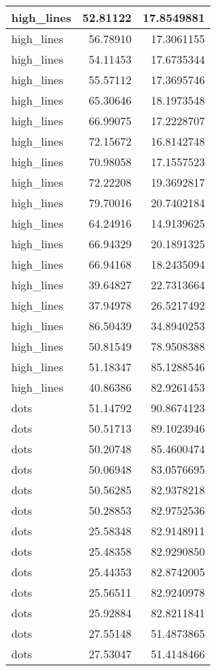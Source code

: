 \documentclass[
]{book}
\theoremstyle{definition}
\theoremstyle{definition}
\theoremstyle{definition}
\theoremstyle{definition}
\theoremstyle{remark}
\begin{document}
\begin{tabular}{l|r|r}
\hline
high\_lines & 52.81122 & 17.8549881\\
\hline
high\_lines & 56.78910 & 17.3061155\\
\hline
high\_lines & 54.11453 & 17.6735344\\
\hline
high\_lines & 55.57112 & 17.3695746\\
\hline
high\_lines & 65.30646 & 18.1973548\\
\hline
high\_lines & 66.99075 & 17.2228707\\
\hline
high\_lines & 72.15672 & 16.8142748\\
\hline
high\_lines & 70.98058 & 17.1557523\\
\hline
high\_lines & 72.22208 & 19.3692817\\
\hline
high\_lines & 79.70016 & 20.7402184\\
\hline
high\_lines & 64.24916 & 14.9139625\\
\hline
high\_lines & 66.94329 & 20.1891325\\
\hline
high\_lines & 66.94168 & 18.2435094\\
\hline
high\_lines & 39.64827 & 22.7313664\\
\hline
high\_lines & 37.94978 & 26.5217492\\
\hline
high\_lines & 86.50439 & 34.8940253\\
\hline
high\_lines & 50.81549 & 78.9508388\\
\hline
high\_lines & 51.18347 & 85.1288546\\
\hline
high\_lines & 40.86386 & 82.9261453\\
\hline
dots & 51.14792 & 90.8674123\\
\hline
dots & 50.51713 & 89.1023946\\
\hline
dots & 50.20748 & 85.4600474\\
\hline
dots & 50.06948 & 83.0576695\\
\hline
dots & 50.56285 & 82.9378218\\
\hline
dots & 50.28853 & 82.9752536\\
\hline
dots & 25.58348 & 82.9148911\\
\hline
dots & 25.48358 & 82.9290850\\
\hline
dots & 25.44353 & 82.8742005\\
\hline
dots & 25.56511 & 82.9240978\\
\hline
dots & 25.92884 & 82.8211841\\
\hline
dots & 27.55148 & 51.4873865\\
\hline
dots & 27.53047 & 51.4148466\\

\end{tabular}
\end{document}
